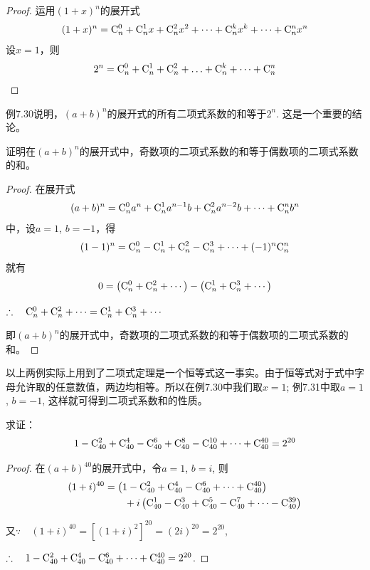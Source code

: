 \begin{proof}
    运用$ (1+x)^{n} $的展开式
\[(1+x)^{n}=\comb{n}{0}+\comb{n}{1}x+\comb{n}{2}x^{2}+\cdots +\comb{n}{k}x^{k}+\cdots +\comb{n}{n}x^{n}\]
设$x=1$，则
\[
2^{n}=\comb{n}{0}+\comb{n}{1}+\comb{n}{2}+\ldots +\comb{n}{k}+\cdots +\comb{n}{n}\]
\end{proof}


例7.30说明，$ (a+b)^{n} $的展开式的所有二项式系数的和等于$ 2^{n}$. 这是一个重要的结论。

\begin{example}
   证明在$ (a+b)^{n} $的展开式中，奇数项的二项式系数的和等于偶数项的二项式系数的和。 
\end{example}

\begin{proof}
    在展开式
\[(a+b)^{n}=\comb{n}{0}a^{n}+\comb{n}{1}a^{n-1}b+\comb{n}{2}a^{n-2}b+\cdots +\comb{n}{n}b^{n}\]
中，设$ a=1$, $ b=-1$，得
\[(1-1)^{n}=\comb{n}{0}-\comb{n}{1}+\comb{n}{2}-\comb{n}{3}+\cdots +(-1)^{n}\comb{n}{n}\]
就有
\[
0=\left(\comb{n}{0}+\comb{n}{2}+\cdots \right)-\left(\comb{n}{1}+\comb{n}{3}+\cdots \right)\]

$\therefore\quad \comb{n}{0}+\comb{n}{2}+\cdots =\comb{n}{1}+\comb{n}{3}+\cdots$

即$(a+b)^{n} $的展开式中，奇数项的二项式系数的和等于偶数项的二项式系数的和。
\end{proof}

以上两例实际上用到了二项式定理是一个恒等式这一事实。由于恒等式对于式中字母允许取的任意数值，两边均相等。所以在例7.30中我们取$x=1$; 例7.31中取$ a=1$,  $b=-1$, 这样就可得到二项式系数和的性质。

\begin{example}
    求证：
\[ 1-\comb{40}{2}+\comb{40}{4}-\comb{40}{6}+\comb{40}{8}-\comb{40}{10}+\cdots +\comb{40}{40}=2^{20}\]
\end{example}

\begin{proof}
    在$ (a+b)^{40} $的展开式中，令$ a=1$, $b=i$, 则
\[\begin{split}
    (1+i)^{40} &=\left(1-\comb{40}{2}+\comb{40}{4}-\comb{40}{6}+\cdots +\comb{40}{40}\right)\\
    &\qquad +i\left(\comb{40}{1}-\comb{40}{3}+\comb{40}{5}-\comb{40}{7}+\cdots-\comb{40}{39}\right)
\end{split}
\]

又$\because\quad (1+i)^{40}=\left[(1+i)^{2}\right]^{20}=(2i)^{20}=2^{20}$,

$\therefore\quad 1-\comb{40}{2}+\comb{40}{4}-\comb{40}{6}+\cdots +\comb{40}{40}=2^{20}$.
\end{proof}

